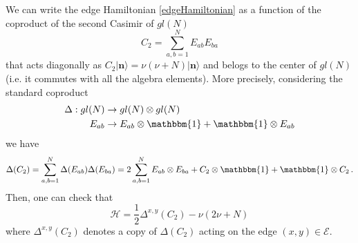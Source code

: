 \documentclass[10pt]{article}
\numberwithin{equation}{section}
\numberwithin{equation}{subsection}
\newcommand{\twoj}{\nu}
\begin{document}
We can write the edge Hamiltonian \eqref{edgeHamiltonian} as a function of the coproduct of the second Casimir of $gl(N)$
\begin{equation}\label{secondCasimir}
    C_{2}=\sum_{a,b=1}^{N}E_{ab}E_{ba}
\end{equation}
that acts diagonally as $C_{2}|\bm{n}\rangle=\twoj(\twoj+N)|\bm{n}\rangle$ and belogs to the center of $gl(N)$ (i.e. it commutes with all the algebra elements).  
More precisely,  considering the standard coproduct 
\begin{equation}
\begin{split}
\Delta:gl(N)&\to gl(N)\otimes gl(N)\\
E_{ab}&\to E_{ab}\otimes \mathbbm{1}+\mathbbm{1}\otimes E_{ab}
\end{split}
\end{equation}
we have 
\begin{equation}
\Delta(C_{2})=\sum_{a,b=1}^{N}\Delta(E_{ab})\Delta(E_{ba})=2\sum_{a,b=1}^{N}E_{ab}\otimes E_{ba}+C_{2}\otimes \mathbbm{1}+\mathbbm{1}\otimes C_{2}\,.
\end{equation}
Then, one can check that 
\begin{equation}\label{hamiltonianCasimir}
	\mathcal{H}=\frac{1}{2}\Delta^{x,y}(C_{2})-\twoj(2\twoj+N)
\end{equation}
where $\Delta^{x,y}(C_2)$ denotes a {\color{blue}copy} of $\Delta(C_2)$ acting on  
the edge $(x,y)\in \mathcal{E}$.
\end{document}
